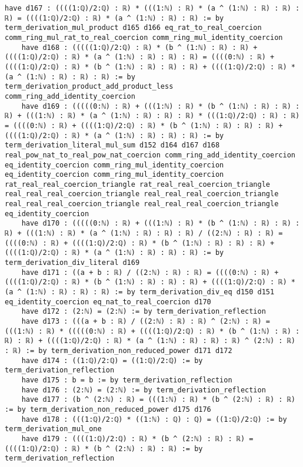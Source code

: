 \documentclass{article}
\begin{document}
\begin{tcolorbox}[colback=white!10, width=\linewidth]
\begin{lstlisting}[language=Lean4]
    have d167 : ((((1:ℚ)/2:ℚ) : ℝ) * (((1:ℕ) : ℝ) * (a ^ (1:ℕ) : ℝ) : ℝ) : ℝ) = ((((1:ℚ)/2:ℚ) : ℝ) * (a ^ (1:ℕ) : ℝ) : ℝ) := by term_derivation_mul_product d165 d166 eq_rat_to_real_coercion comm_ring_mul_rat_to_real_coercion comm_ring_mul_identity_coercion
    have d168 : (((((1:ℚ)/2:ℚ) : ℝ) * (b ^ (1:ℕ) : ℝ) : ℝ) + ((((1:ℚ)/2:ℚ) : ℝ) * (a ^ (1:ℕ) : ℝ) : ℝ) : ℝ) = ((((0:ℕ) : ℝ) + ((((1:ℚ)/2:ℚ) : ℝ) * (b ^ (1:ℕ) : ℝ) : ℝ) : ℝ) + ((((1:ℚ)/2:ℚ) : ℝ) * (a ^ (1:ℕ) : ℝ) : ℝ) : ℝ) := by term_derivation_product_add_product_less comm_ring_add_identity_coercion
    have d169 : (((((0:ℕ) : ℝ) + (((1:ℕ) : ℝ) * (b ^ (1:ℕ) : ℝ) : ℝ) : ℝ) + (((1:ℕ) : ℝ) * (a ^ (1:ℕ) : ℝ) : ℝ) : ℝ) * (((1:ℚ)/2:ℚ) : ℝ) : ℝ) = ((((0:ℕ) : ℝ) + ((((1:ℚ)/2:ℚ) : ℝ) * (b ^ (1:ℕ) : ℝ) : ℝ) : ℝ) + ((((1:ℚ)/2:ℚ) : ℝ) * (a ^ (1:ℕ) : ℝ) : ℝ) : ℝ) := by term_derivation_literal_mul_sum d152 d164 d167 d168 real_pow_nat_to_real_pow_nat_coercion comm_ring_add_identity_coercion eq_identity_coercion comm_ring_mul_identity_coercion eq_identity_coercion comm_ring_mul_identity_coercion rat_real_real_coercion_triangle rat_real_real_coercion_triangle real_real_real_coercion_triangle real_real_real_coercion_triangle real_real_real_coercion_triangle real_real_real_coercion_triangle eq_identity_coercion
    have d170 : (((((0:ℕ) : ℝ) + (((1:ℕ) : ℝ) * (b ^ (1:ℕ) : ℝ) : ℝ) : ℝ) + (((1:ℕ) : ℝ) * (a ^ (1:ℕ) : ℝ) : ℝ) : ℝ) / ((2:ℕ) : ℝ) : ℝ) = ((((0:ℕ) : ℝ) + ((((1:ℚ)/2:ℚ) : ℝ) * (b ^ (1:ℕ) : ℝ) : ℝ) : ℝ) + ((((1:ℚ)/2:ℚ) : ℝ) * (a ^ (1:ℕ) : ℝ) : ℝ) : ℝ) := by term_derivation_div_literal d169
    have d171 : ((a + b : ℝ) / ((2:ℕ) : ℝ) : ℝ) = ((((0:ℕ) : ℝ) + ((((1:ℚ)/2:ℚ) : ℝ) * (b ^ (1:ℕ) : ℝ) : ℝ) : ℝ) + ((((1:ℚ)/2:ℚ) : ℝ) * (a ^ (1:ℕ) : ℝ) : ℝ) : ℝ) := by term_derivation_div_eq d150 d151 eq_identity_coercion eq_nat_to_real_coercion d170
    have d172 : (2:ℕ) = (2:ℕ) := by term_derivation_reflection
    have d173 : (((a + b : ℝ) / ((2:ℕ) : ℝ) : ℝ) ^ (2:ℕ) : ℝ) = (((1:ℕ) : ℝ) * (((((0:ℕ) : ℝ) + ((((1:ℚ)/2:ℚ) : ℝ) * (b ^ (1:ℕ) : ℝ) : ℝ) : ℝ) + ((((1:ℚ)/2:ℚ) : ℝ) * (a ^ (1:ℕ) : ℝ) : ℝ) : ℝ) ^ (2:ℕ) : ℝ) : ℝ) := by term_derivation_non_reduced_power d171 d172
    have d174 : ((1:ℚ)/2:ℚ) = ((1:ℚ)/2:ℚ) := by term_derivation_reflection
    have d175 : b = b := by term_derivation_reflection
    have d176 : (2:ℕ) = (2:ℕ) := by term_derivation_reflection
    have d177 : (b ^ (2:ℕ) : ℝ) = (((1:ℕ) : ℝ) * (b ^ (2:ℕ) : ℝ) : ℝ) := by term_derivation_non_reduced_power d175 d176
    have d178 : (((1:ℚ)/2:ℚ) * ((1:ℕ) : ℚ) : ℚ) = ((1:ℚ)/2:ℚ) := by term_derivation_mul_one
    have d179 : ((((1:ℚ)/2:ℚ) : ℝ) * (b ^ (2:ℕ) : ℝ) : ℝ) = ((((1:ℚ)/2:ℚ) : ℝ) * (b ^ (2:ℕ) : ℝ) : ℝ) := by term_derivation_reflection

\end{lstlisting}
\end{tcolorbox}
\end{document}
